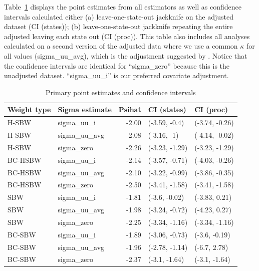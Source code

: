 \documentclass[12pt]{article}
\begin{document}
Table~\ref{tab:confintmain} displays the point estimates from all estimators as well as confidence intervals calculated either (a) leave-one-state-out jackknife on the adjusted dataset (CI (states)); (b) leave-one-state-out jackknife repeating the entire adjusted leaving each state out (CI (proc)). This table also includes all analyses calculated on a second version of the adjusted data where we use a common $\kappa$ for all values (sigma\_uu\_avg), which is the adjustment suggested by \cite{carroll2006measurement}. Notice that the confidence intervals are identical for ``sigma\_zero'' because this is the unadjusted dataset. ``sigma\_uu\_i'' is our preferred covariate adjustment.

\begin{table}[ht]
\centering
\begin{tabular}{llrll}
  \toprule
Weight type & Sigma estimate & Psihat & CI (states) & CI (proc) \\ 
  \midrule
H-SBW & sigma\_uu\_i & -2.00 & (-3.59, -0.4) & (-3.74, -0.26) \\ 
  H-SBW & sigma\_uu\_avg & -2.08 & (-3.16, -1) & (-4.14, -0.02) \\ 
  H-SBW & sigma\_zero & -2.26 & (-3.23, -1.29) & (-3.23, -1.29) \\ 
  BC-HSBW & sigma\_uu\_i & -2.14 & (-3.57, -0.71) & (-4.03, -0.26) \\ 
  BC-HSBW & sigma\_uu\_avg & -2.10 & (-3.22, -0.99) & (-3.86, -0.35) \\ 
  BC-HSBW & sigma\_zero & -2.50 & (-3.41, -1.58) & (-3.41, -1.58) \\ 
  SBW & sigma\_uu\_i & -1.81 & (-3.6, -0.02) & (-3.83, 0.21) \\ 
  SBW & sigma\_uu\_avg & -1.98 & (-3.24, -0.72) & (-4.23, 0.27) \\ 
  SBW & sigma\_zero & -2.25 & (-3.34, -1.16) & (-3.34, -1.16) \\ 
  BC-SBW & sigma\_uu\_i & -1.89 & (-3.06, -0.73) & (-3.6, -0.19) \\ 
  BC-SBW & sigma\_uu\_avg & -1.96 & (-2.78, -1.14) & (-6.7, 2.78) \\ 
  BC-SBW & sigma\_zero & -2.37 & (-3.1, -1.64) & (-3.1, -1.64) \\ 
   \bottomrule
\end{tabular}
\caption{Primary point estimates and confidence intervals}
\label{tab:confintmain}
\end{table}
\end{document}
